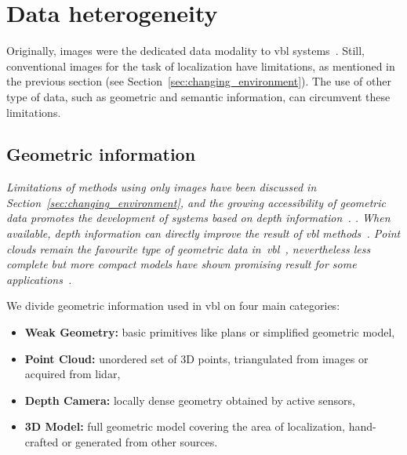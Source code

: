 \section{Data heterogeneity}
\label{sec:application}	



	Originally, images were the dedicated data modality to \ac{vbl} systems~\citep{Robertson2004}. Still, conventional images for the task of localization have limitations, as mentioned in the previous section (see Section~\ref{sec:changing_environment}). The use of other type of data, such as geometric and semantic information, can circumvent these limitations.

	\subsection{Geometric information}
		\label{subsec:geometric_info}
		\textit{Limitations of methods using only images have been discussed in Section~\ref{sec:changing_environment}, and the growing accessibility of geometric data promotes the development of systems based on depth information~\citep{Paparoditis2012}. . When available, depth information can directly improve the result of \ac{vbl} methods~\citep{Ni2009,Gee2012,Shotton2013,Torii2015,Cavallari}. Point clouds remain the favourite type of geometric data in~\ac{vbl}~\citep{Sattler2016a}, nevertheless less complete but more compact models have shown promising result for some applications~\citep{Ramalingam2010,Bansal2014,Christie2016,Torii2015}.}
				
		We divide geometric information used in \ac{vbl} on four main categories:
		\begin{itemize}
			\item \textbf{Weak Geometry:} basic primitives like plans or simplified geometric model,
			\item \textbf{Point Cloud:} unordered set of 3D points, triangulated from images or acquired from lidar,
			\item \textbf{Depth Camera:} locally dense geometry obtained by active sensors,
			\item \textbf{3D Model:} full geometric model covering the area of localization, hand-crafted or generated from other sources.
		\end{itemize}
        
